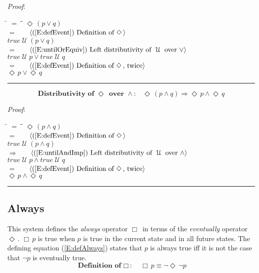 \documentclass[12pt, fleqn, leqno]{article}
\newcommand{\lgap}{2pt}                             %
\newcommand{\mymathindent}{24pt}                    %
\newcommand{\impl}{\ensuremath{\Rightarrow}}        %
\newcommand{\Until}{\;\mathcal{U}\;}
\newcommand{\Event}{\Diamond\,}
\newcommand{\Always}{\Box\,}
\newcommand{\myqed}{\rule[-.23ex]{1.2ex}{2.0ex}}
\newcommand{\myqedtab}{\hspace{384pt}}              %
\newcommand{\Gll} {\langle}                         %
\newcommand{\Ggg} {\rangle}                         %
\newcommand{\Hint}[1]     {\ \ \ $\Gll              \mbox{#1} \Ggg$ }   %
\begin{document}
\emph{Proof}:
\begin{tabbing}
\hspace{\mymathindent} \= $= \;$ \= \myqedtab \= \kill
  \> \>   $\Event(p \lor q)$\\[\lgap]
  \> $=$  \>  \Hint{(\ref{E:defEvent}) Definition of $\Event$}\\[\lgap]
  \> \>   $true \Until (p \lor q)$\\[\lgap]
  \> $=$  \>  \Hint{(\ref{E:untilOrEquiv}) Left distributivity of $\Until$ over $\lor$}\\[\lgap]
  \> \>   $true \Until p \lor true \Until q$\\[\lgap]
  \> $=$  \>  \Hint{(\ref{E:defEvent}) Definition of $\Event$, twice}\\[\lgap]
  \> \>   $\Event p \lor \Event q$ \quad \myqed
\end{tabbing}
\begin{equation}\label{E:distEventAnd}
\textbf{Distributivity of $\Event$ over $\land$:}\quad \Event(p \land q) \impl \Event p \land \Event q
\end{equation}

\emph{Proof}:
\begin{tabbing}
\hspace{\mymathindent} \= $= \;$ \= \myqedtab \= \kill
  \> \>   $\Event(p \land q)$\\[\lgap]
  \> $=$  \>  \Hint{(\ref{E:defEvent}) Definition of $\Event$}\\[\lgap]
  \> \>   $true \Until (p \land q)$\\[\lgap]
  \> $\impl$  \>  \Hint{(\ref{E:untilAndImp}) Left distributivity of $\Until$ over $\land$}\\[\lgap]
  \> \>   $true \Until p \land true \Until q$\\[\lgap]
  \> $=$  \>  \Hint{(\ref{E:defEvent}) Definition of $\Event$, twice}\\[\lgap]
  \> \>   $\Event p \land \Event q$ \quad \myqed
\end{tabbing}

\subsection{Always}\label{section-always}

This system defines the \textit{always} operator $\Always$ in terms of the \textit{eventually} operator $\Event$.
$\Always p$ is true when $p$ is true in the current state and in all future states.
The defining equation (\ref{E:defAlways}) states that $p$ is always true iff it is not the case that $\neg p$ is eventually true.
\begin{equation}\label{E:defAlways}
\textbf{Definition of $\Always$:}\quad \Always p \equiv \neg\Event\neg p
\end{equation}
\end{document}
